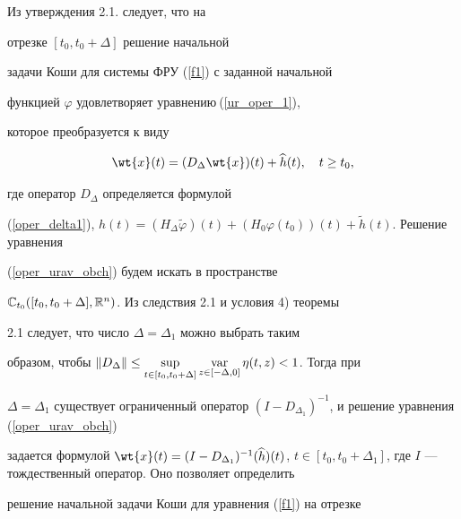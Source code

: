 \begin{pf}


Из утверждения 2.1. следует, что на


отрезке $ [t_{0},t_{0}+\Delta] $ решение начальной


задачи Коши для системы ФРУ (\ref{f1}) с заданной начальной


функцией $\varphi$ удовлетворяет уравнению$\ $(\ref{ur_oper_1}),


которое преобразуется к виду


\begin{equation}


\wt{x} (t)=(D_{\Delta}\wt{x}) (


t) +\widehat{h} (t),\quad t\geq t_{0}


,\label{oper_urav_obch}


\end{equation}


где оператор $D_{\Delta}$ определяется формулой


(\ref{oper_delta1}), $\widehat{h} (t)=(


H_{\Delta}\widetilde{\varphi}) (t) + (


H_{0}\varphi (t_{0})) (t)


+\widetilde{h} (t) $. Решение уравнения


(\ref{oper_urav_obch}) будем искать в пространстве


$\Bbb{C}_{t_{0}} ([t_{0},t_{0}+\Delta]


,\Bbb{R}^{n}) $. Из следствия 2.1 и условия 4) теоремы


2.1 следует, что число $\Delta=\Delta_{1}$ можно выбрать таким


образом, чтобы $ \| D_{\Delta} \|


\leq\sup\limits_{t\in [t_{0},t_{0}+\Delta]}


\Var\limits_{z\in [-\Delta,0]}\eta (t,z) <1$. Тогда при


$\Delta=\Delta_{1}$ существует ограниченный оператор $ (I-D_{\Delta_{1}


}) ^{-1}$, и решение уравнения (\ref{oper_urav_obch})


задается формулой $\wt{x} (t)=(


I-D_{\Delta_{1}}) ^{-1} (\widehat{h}) (


t) $, $t\in [t_{0},t_{0}+\Delta


_{1}] $, где $I$ --- тождественный оператор. Оно позволяет определить 


решение начальной задачи Коши для уравнения (\ref{f1}) на отрезке



\end{pf}
